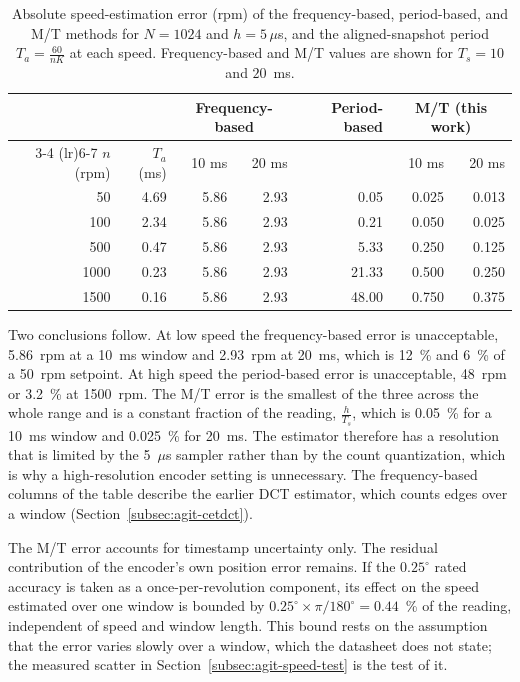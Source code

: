 \begin{table}[htbp]
    \centering
    \caption[Speed-estimation error of the three methods]{Absolute speed-estimation error (rpm) of the frequency-based, period-based, and M/T methods for $N = 1024$ and $h = 5\,\mu$s, and the aligned-snapshot period $T_a = \frac{60}{nK}$ at each speed. Frequency-based and M/T values are shown for $T_s = 10$ and $20$~ms.}
    \label{tab:esterr}
    \begin{tabular}{@{}rrrrrrr@{}}
        \toprule
        & & \multicolumn{2}{c}{Frequency-based} & Period-based & \multicolumn{2}{c}{M/T (this work)} \\
        \cmidrule(lr){3-4} \cmidrule(lr){6-7}
        $n$ (rpm) & $T_a$ (ms) & 10 ms & 20 ms & & 10 ms & 20 ms \\
        \midrule
        50 & 4.69 & 5.86 & 2.93 & 0.05 & 0.025 & 0.013 \\
        100 & 2.34 & 5.86 & 2.93 & 0.21 & 0.050 & 0.025 \\
        500 & 0.47 & 5.86 & 2.93 & 5.33 & 0.250 & 0.125 \\
        1000 & 0.23 & 5.86 & 2.93 & 21.33 & 0.500 & 0.250 \\
        1500 & 0.16 & 5.86 & 2.93 & 48.00 & 0.750 & 0.375 \\
        \bottomrule
    \end{tabular}
\end{table}

Two conclusions follow. At low speed the frequency-based error is unacceptable, 5.86~rpm at a 10~ms window and 2.93~rpm at 20~ms, which is 12~\% and 6~\% of a 50~rpm setpoint. At high speed the period-based error is unacceptable, 48~rpm or 3.2~\% at 1500~rpm. The M/T error is the smallest of the three across the whole range and is a constant fraction of the reading, $\frac{h}{T_s}$, which is 0.05~\% for a 10~ms window and 0.025~\% for 20~ms. The estimator therefore has a resolution that is limited by the 5~$\mu$s sampler rather than by the count quantization, which is why a high-resolution encoder setting is unnecessary. The frequency-based columns of the table describe the earlier DCT estimator, which counts edges over a window (Section~\ref{subsec:agit-cetdct}).

The M/T error accounts for timestamp uncertainty only. The residual contribution of the encoder's own position error remains. If the $0.25^{\circ}$ rated accuracy is taken as a once-per-revolution component, its effect on the speed estimated over one window is bounded by $0.25^{\circ} \times \pi / 180^{\circ} = 0.44$~\% of the reading, independent of speed and window length. This bound rests on the assumption that the error varies slowly over a window, which the datasheet does not state; the measured scatter in Section~\ref{subsec:agit-speed-test} is the test of it.

